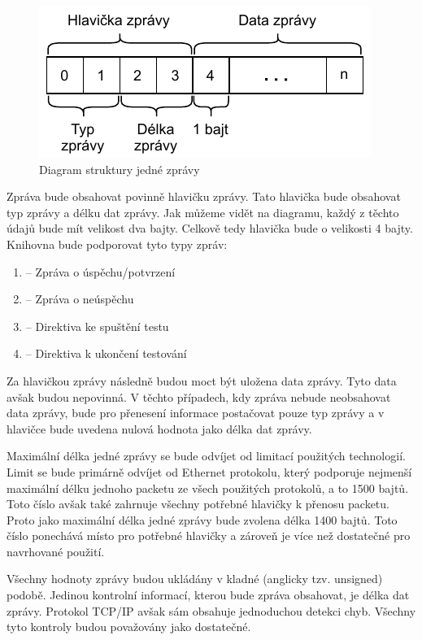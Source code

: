 \begin{figure}[htbp]
    \centering 
    \includegraphics{assets/img/message.pdf}
    \caption{Diagram struktury jedné zprávy}
    \label{fig:message}
\end{figure}

Zpráva bude obsahovat povinně hlavičku zprávy. Tato hlavička bude obsahovat typ zprávy a délku dat zprávy. Jak můžeme vidět na diagramu, každý z těchto údajů bude mít velikost dva bajty. Celkově tedy hlavička bude o velikosti 4 bajty. Knihovna bude podporovat tyto typy zpráv:

\begin{enumerate}
    \item {} -- Zpráva o úspěchu/potvrzení
    \item {} -- Zpráva o neúspěchu
    \item {} -- Direktiva ke spuštění testu
    \item {} -- Direktiva k ukončení testování
\end{enumerate}

Za hlavičkou zprávy následně budou moct být uložena data zprávy. Tyto data avšak budou nepovinná. V těchto případech, kdy zpráva nebude neobsahovat data zprávy, bude pro přenesení informace postačovat pouze typ zprávy a v hlavičce bude uvedena nulová hodnota jako délka dat zprávy. 

Maximální délka jedné zprávy se bude odvíjet od limitací použitých technologií. Limit se bude primárně odvíjet od Ethernet protokolu, který podporuje nejmenší maximální délku jednoho packetu ze všech použitých protokolů, a to 1500 bajtů. Toto číslo avšak také zahrnuje všechny potřebné hlavičky k přenosu packetu. Proto jako maximální délka jedné zprávy bude zvolena délka 1400 bajtů. Toto číslo ponechává místo pro potřebné hlavičky a zároveň je více než dostatečné pro navrhované použití. \cite{max_packet_size} 

Všechny hodnoty zprávy budou ukládány v kladné (anglicky tzv. unsigned) podobě. Jedinou kontrolní informací, kterou bude zpráva obsahovat, je délka dat zprávy. Protokol TCP/IP avšak sám obsahuje jednoduchou detekci chyb. Všechny tyto kontroly budou považovány jako dostatečné.


